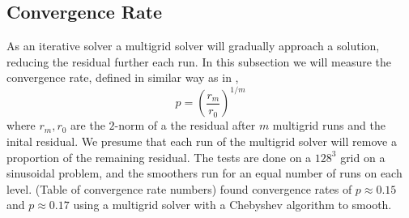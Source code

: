 \subsection{Convergence Rate}
	As an iterative solver a multigrid solver will gradually approach a solution,
	reducing the residual further each run. In this subsection we will measure the convergence
	rate, defined in similar way as in \citet{zhukov_parallel_2014},
	\begin{equation}
		p = \left(\frac{r_m}{r_0}\right)^{1/m}
	\end{equation}
	where \(r_m, r_0\) are the \(2\)-norm of a the residual after \(m\) multigrid runs
 	and the inital residual. We presume that each run of the multigrid solver will
	remove a proportion of the remaining residual.
	The tests are done on a \(128^3\) grid on a sinusoidal
	problem, and the smoothers run for an equal number of runs on each level.
	(Table of convergence rate numbers)
	\citeauthor{zhukov_parallel_2014} found convergence rates of \(p \approx 0.15\) and \(p \approx 0.17\)
	using a multigrid solver with a Chebyshev algorithm to smooth.
